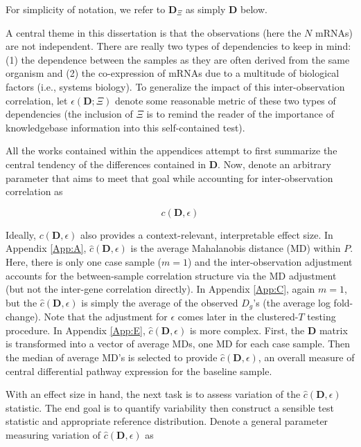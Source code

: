 \noindent \noindent For simplicity of notation, we refer to $\mathbf{D}_{\Xi}$ as simply $\mathbf{D}$ below.

A central theme in this dissertation is that the observations (here the $N$ mRNAs) are not independent. There are really two types of dependencies to keep in mind: (1) the dependence between the samples as they are often derived from the same organism and (2) the co-expression of mRNAs due to a multitude of biological factors (i.e., systems biology). To generalize the impact of this inter-observation correlation, let $\epsilon(\mathbf{D}; \Xi)$ denote some reasonable metric of these two types of dependencies (the inclusion of $\Xi$ is to remind the reader of the importance of knowledgebase information into this self-contained test).

All the works contained within the appendices attempt to first summarize the central tendency of the differences contained in $\mathbf{D}$. Now, denote an arbitrary parameter that aims to meet that goal while accounting for inter-observation correlation as

\begin{equation}
\label{eq:central}
c(\mathbf{D}, \epsilon) \tag{1}
\end{equation}

Ideally, $c(\mathbf{D}, \epsilon)$ also provides a context-relevant, interpretable effect size. In Appendix \ref{App:A}, $\hat{c}(\mathbf{D}, \epsilon)$ is the average Mahalanobis distance (MD) within $P$. Here, there is only one case sample ($m=1$) and the inter-observation adjustment accounts for the between-sample correlation structure via the MD adjustment (but not the inter-gene correlation directly). In Appendix \ref{App:C}, again $m=1$, but the $\hat{c}(\mathbf{D}, \epsilon)$ is simply the average of the observed $D_{g}$\rq s (the average log fold-change). Note that the adjustment for $\epsilon$ comes later in the clustered-$T$ testing procedure. In Appendix \ref{App:E}, $\hat{c}(\mathbf{D}, \epsilon)$ is more complex. First, the $\mathbf{D}$ matrix is transformed into a vector of average MDs, one MD for each case sample. Then the median of average MD\rq s is selected to provide $\hat{c}(\mathbf{D}, \epsilon)$, an overall measure of central differential pathway expression for the baseline sample.

With an effect size in hand, the next task is to assess variation of the $\hat{c}(\mathbf{D}, \epsilon)$ statistic. The end goal is to quantify variability then construct a sensible test statistic and appropriate reference distribution. Denote a general parameter measuring variation of $\hat{c}(\mathbf{D}, \epsilon)$ as

